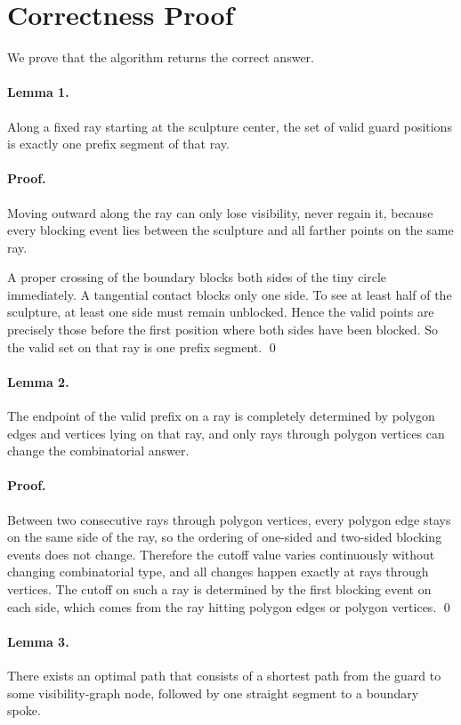 \documentclass[11pt]{article}
\begin{document}
\section*{Correctness Proof}

We prove that the algorithm returns the correct answer.

\paragraph{Lemma 1.}
Along a fixed ray starting at the sculpture center, the set of valid guard positions is exactly one prefix
segment of that ray.

\paragraph{Proof.}
Moving outward along the ray can only lose visibility, never regain it, because every blocking event lies
between the sculpture and all farther points on the same ray.

A proper crossing of the boundary blocks both sides of the tiny circle immediately. A tangential contact
blocks only one side. To see at least half of the sculpture, at least one side must remain unblocked.
Hence the valid points are precisely those before the first position where both sides have been blocked.
So the valid set on that ray is one prefix segment. \qed

\paragraph{Lemma 2.}
The endpoint of the valid prefix on a ray is completely determined by polygon edges and vertices lying on
that ray, and only rays through polygon vertices can change the combinatorial answer.

\paragraph{Proof.}
Between two consecutive rays through polygon vertices, every polygon edge stays on the same side of the
ray, so the ordering of one-sided and two-sided blocking events does not change. Therefore the cutoff
value varies continuously without changing combinatorial type, and all changes happen exactly at rays
through vertices. The cutoff on such a ray is determined by the first blocking event on each side, which
comes from the ray hitting polygon edges or polygon vertices. \qed

\paragraph{Lemma 3.}
There exists an optimal path that consists of a shortest path from the guard to some visibility-graph node,
followed by one straight segment to a boundary spoke.
\end{document}
